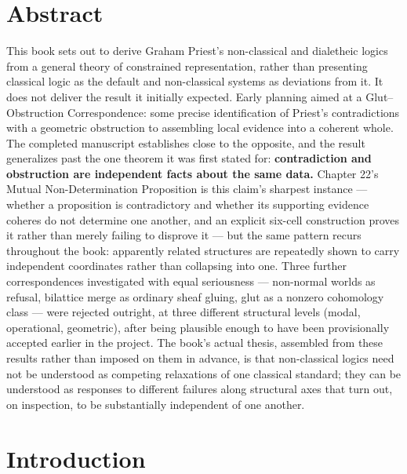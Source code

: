 \hypertarget{front-matter}{%
\label{front-matter}}

\hypertarget{abstract}{%
\chapter*{Abstract}
\label{abstract}}

This book sets out to derive Graham Priest's non-classical and dialetheic
logics from a general theory of constrained representation, rather than
presenting classical logic as the default and non-classical systems as
deviations from it. It does not deliver the result it initially expected.
Early planning aimed at a Glut--Obstruction Correspondence: some precise
identification of Priest's contradictions with a geometric obstruction to
assembling local evidence into a coherent whole. The completed manuscript
establishes close to the opposite, and the result generalizes past the
one theorem it was first stated for: \textbf{contradiction and obstruction are
independent facts about the same data.} Chapter 22's Mutual
Non-Determination Proposition is this claim's sharpest instance --- whether
a proposition is contradictory and whether its supporting evidence
coheres do not determine one another, and an explicit six-cell
construction proves it rather than merely failing to disprove it --- but
the same pattern recurs throughout the book: apparently related
structures are repeatedly shown to carry independent coordinates rather
than collapsing into one. Three further correspondences investigated
with equal seriousness --- non-normal worlds as refusal, bilattice merge as
ordinary sheaf gluing, glut as a nonzero cohomology class --- were rejected
outright, at three different structural levels (modal, operational,
geometric), after being plausible enough to have been provisionally
accepted earlier in the project. The book's actual thesis, assembled from
these results rather than imposed on them in advance, is that
non-classical logics need not be understood as competing relaxations of
one classical standard; they can be understood as responses to different
failures along structural axes that turn out, on inspection, to be
substantially independent of one another.

\hypertarget{introduction}{%
\chapter*{Introduction}
\label{introduction}}

